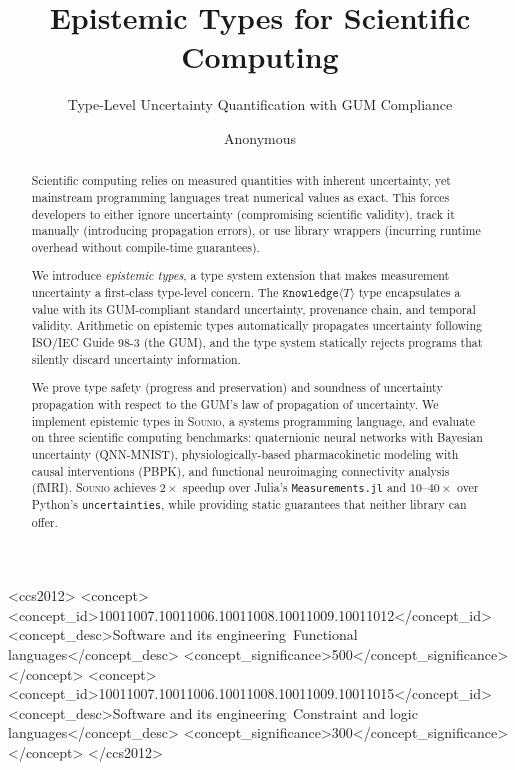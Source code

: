 \documentclass[acmsmall,screen,review,anonymous]{acmart}
\newcommand{\sounio}{\textsc{Sounio}\xspace}
\newcommand{\know}[1]{\texttt{Knowledge}\langle #1 \rangle}
\begin{document}
\title{Epistemic Types for Scientific Computing}
\subtitle{Type-Level Uncertainty Quantification with GUM Compliance}

\author{Anonymous}

\begin{abstract}
Scientific computing relies on measured quantities with inherent uncertainty,
yet mainstream programming languages treat numerical values as exact.
This forces developers to either ignore uncertainty (compromising scientific
validity), track it manually (introducing propagation errors), or use library
wrappers (incurring runtime overhead without compile-time guarantees).

We introduce \emph{epistemic types}, a type system extension that makes
measurement uncertainty a first-class type-level concern.
The $\know{T}$ type encapsulates a value with its GUM-compliant standard
uncertainty, provenance chain, and temporal validity.
Arithmetic on epistemic types automatically propagates uncertainty following
ISO/IEC Guide 98-3 (the GUM), and the type system statically rejects
programs that silently discard uncertainty information.

We prove type safety (progress and preservation) and soundness of uncertainty
propagation with respect to the GUM's law of propagation of uncertainty.
We implement epistemic types in \sounio, a systems programming language,
and evaluate on three scientific computing benchmarks:
quaternionic neural networks with Bayesian uncertainty (QNN-MNIST),
physiologically-based pharmacokinetic modeling with causal interventions (PBPK),
and functional neuroimaging connectivity analysis (fMRI).
\sounio achieves $2\times$ speedup over Julia's \texttt{Measurements.jl}
and $10$--$40\times$ over Python's \texttt{uncertainties}, while providing
static guarantees that neither library can offer.
\end{abstract}

\begin{CCSXML}
<ccs2012>
<concept><concept_id>10011007.10011006.10011008.10011009.10011012</concept_id>
<concept_desc>Software and its engineering~Functional languages</concept_desc>
<concept_significance>500</concept_significance></concept>
<concept><concept_id>10011007.10011006.10011008.10011009.10011015</concept_id>
<concept_desc>Software and its engineering~Constraint and logic languages</concept_desc>
<concept_significance>300</concept_significance></concept>
</ccs2012>
\end{CCSXML}
\end{document}
